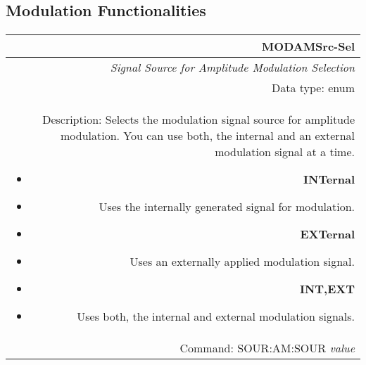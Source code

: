 \documentclass[openany]{article}
\begin{document}
	\subsection{Modulation Functionalities}\label{pvgroup:function} %

		\paragraph{} %

%
		\begin{tabular}{N}
			\hline
			\bfseries MODAMSrc-Sel \\ \hline
			\emph{Signal Source for Amplitude Modulation Selection} \\
			Data type: enum \\  
			Description: Selects the modulation signal source for amplitude modulation. You can use both, the internal and an external modulation signal at a time.\begin{itemize}[noitemsep]
				\small
				\item[] \textbf{INTernal} 
				\item[]	Uses the internally generated signal for modulation.
				\item[] \textbf{EXTernal}
				\item[] Uses an externally applied modulation signal.
				\item[] \textbf{INT,EXT}
				\item[] Uses both, the internal and external modulation signals.
			\end{itemize} \\
			Command: SOUR:AM:SOUR \emph{value} \\

		\end{tabular}
\end{document}
